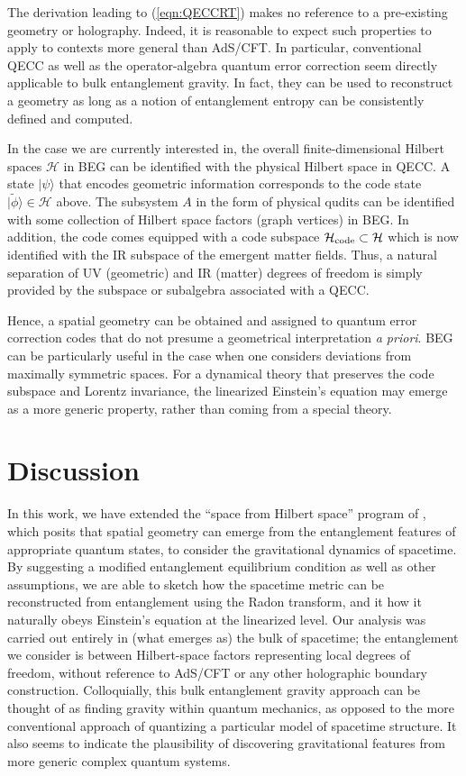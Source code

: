 \documentclass[%
12pt,preprint,
nofootinbib,
amsmath,amssymb,
aps,
prd,
showpacs,
superscriptaddress
]{revtex4-2}
\begin{document}
The derivation leading to (\ref{eqn:QECCRT}) makes no reference to a pre-existing geometry or holography. Indeed, it is reasonable to expect such properties to apply to contexts more general than AdS/CFT.  
In particular, conventional QECC as well as the operator-algebra quantum error correction seem directly applicable to bulk entanglement gravity. In fact, they can be used to reconstruct a geometry as long as a notion of entanglement entropy can be consistently defined and computed.  

In the case we are currently interested in, the overall finite-dimensional Hilbert spaces $\mathcal{H}$ in BEG can be identified with the physical Hilbert space in QECC. 
A state $|\psi\rangle$ that encodes geometric information corresponds to the code state $|\tilde{\phi}\rangle\in\mathcal{H}$ above. 
The subsystem $A$ in the form of physical qudits can be identified with some collection of Hilbert space factors (graph vertices) in BEG. 
In addition, the code comes equipped with a code subspace $\mathcal{H}_{\rm code}\subset \mathcal{H}$ which is now identified with the IR subspace of the emergent matter fields. Thus, a natural separation of UV (geometric) and IR (matter) degrees of freedom is simply provided by the subspace or subalgebra associated with a QECC.

Hence, a spatial geometry can be obtained and assigned to quantum error correction codes that do not presume a geometrical interpretation \emph{a priori}. BEG can be particularly useful in the case when one considers deviations from maximally symmetric spaces. For a dynamical theory that preserves the code subspace and Lorentz invariance, the linearized Einstein's equation may emerge as a more generic property, rather than coming from a special theory. 



\section{Discussion}

In this work, we have extended the ``space from Hilbert space'' program of \cite{Cao:2016mst}, which posits that spatial geometry can emerge from the entanglement features of appropriate quantum states, to consider the gravitational dynamics of spacetime.
By suggesting a modified entanglement equilibrium condition as well as other assumptions, we are able to sketch how the spacetime metric can be reconstructed from entanglement using the Radon transform, and it how it naturally obeys Einstein's equation at the linearized level.
Our analysis was carried out entirely in (what emerges as) the bulk of spacetime; the entanglement we consider is between Hilbert-space factors representing local degrees of freedom, without reference to AdS/CFT or any other holographic boundary construction.
Colloquially, this bulk entanglement gravity approach can be thought of as finding gravity within quantum mechanics, as opposed to the more conventional approach of quantizing a particular model of spacetime structure.
It also seems to indicate the plausibility of discovering gravitational features from more generic complex quantum systems.
\end{document}
